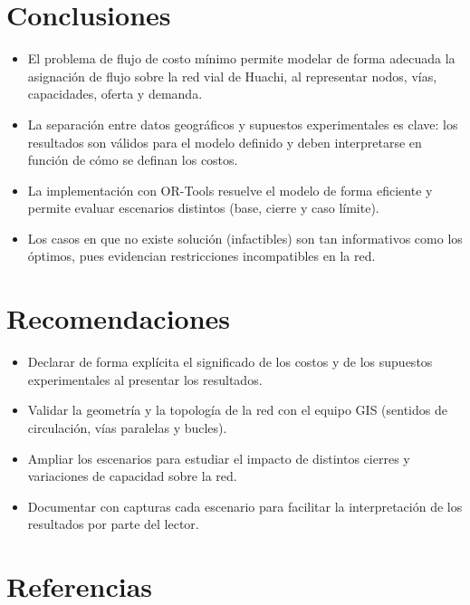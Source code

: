 \documentclass{article}
\begin{document}
\section{Conclusiones}

\begin{itemize}
    \item El problema de flujo de costo mínimo permite modelar de forma
          adecuada la asignación de flujo sobre la red vial de Huachi, al
          representar nodos, vías, capacidades, oferta y demanda.
    \item La separación entre datos geográficos y supuestos experimentales es
          clave: los resultados son válidos para el modelo definido y deben
          interpretarse en función de cómo se definan los costos.
    \item La implementación con OR-Tools resuelve el modelo de forma eficiente
          y permite evaluar escenarios distintos (base, cierre y caso límite).
    \item Los casos en que no existe solución (infactibles) son tan
          informativos como los óptimos, pues evidencian restricciones
          incompatibles en la red.
\end{itemize}

\section{Recomendaciones}

\begin{itemize}
    \item Declarar de forma explícita el significado de los costos y de los
          supuestos experimentales al presentar los resultados.
    \item Validar la geometría y la topología de la red con el equipo GIS
          (sentidos de circulación, vías paralelas y bucles).
    \item Ampliar los escenarios para estudiar el impacto de distintos cierres
          y variaciones de capacidad sobre la red.
    \item Documentar con capturas cada escenario para facilitar la
          interpretación de los resultados por parte del lector.
\end{itemize}

\section{Referencias}

\nocite{*}


\end{document}
